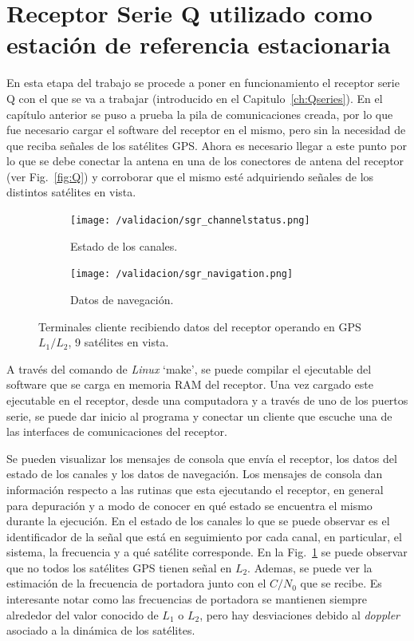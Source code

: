 \documentclass[a4paper,12pt,oneside,onecolumn,final,openright]{book}%
\begin{document}
\section{Receptor Serie Q utilizado como estación de referencia estacionaria}
	En esta etapa del trabajo se procede a poner en funcionamiento el receptor serie Q con el que se va a trabajar (introducido en el Capitulo~\ref{ch:Qseries}). En el capítulo anterior se puso a prueba la pila de comunicaciones creada, por lo que fue necesario cargar el software del receptor en el mismo, pero sin la necesidad de que reciba señales de los satélites GPS. Ahora es necesario llegar a este punto por lo que se debe conectar la antena en una de los conectores de antena del receptor (ver Fig.~\ref{fig:Q}) y corroborar que el mismo esté adquiriendo señales de los distintos satélites en vista. 
\begin{figure}
\begin{subfigure}{1\linewidth}
    \centering
	\texttt{[image: /validacion/sgr\_channelstatus.png]}
    \caption{Estado de los canales.}
    \label{fig:sgr_channelstatus}
\end{subfigure}

\begin{subfigure}{1\linewidth}
    \centering
	\texttt{[image: /validacion/sgr\_navigation.png]}
    \caption{Datos de navegación.}
    \label{fig:sgr_navigation}
\end{subfigure}
\caption{Terminales cliente recibiendo datos del receptor operando en GPS $L_1/L_2$, 9 satélites en vista.}
\label{fig:sgrclient}
\end{figure}
	A través del comando de \textit{Linux} {\ttfamily `make'}, se puede compilar el ejecutable del software que se carga en memoria RAM del receptor. Una vez cargado este ejecutable en el receptor, desde una computadora y a través de uno de los puertos serie, se puede dar inicio al programa y conectar un cliente que escuche una de las interfaces de comunicaciones del receptor. 
	
	Se pueden visualizar los mensajes de consola que envía el receptor, los datos del estado de los canales y los datos de navegación. Los mensajes de consola dan información respecto a las rutinas que esta ejecutando el receptor, en general para depuración y a modo de conocer en qué estado se encuentra el mismo durante la ejecución. En el estado de los canales lo que se puede observar es el identificador de la señal que está en seguimiento por cada canal, en particular, el sistema, la frecuencia y a qué satélite corresponde. En la Fig.~\ref{fig:sgr_channelstatus} se puede observar que no todos los satélites GPS tienen señal en $L_2$. Ademas, se puede ver la estimación de la frecuencia de portadora junto con el $C/N_0$ que se recibe. Es interesante notar como las frecuencias de portadora se mantienen siempre alrededor del valor conocido de $L_1$ o $L_2$, pero hay desviaciones debido al \textit{doppler} asociado a la dinámica de los satélites. 
	
\end{document}

